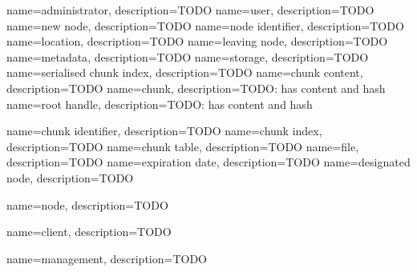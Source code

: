 {
	name={administrator},
	description={TODO}
}
{
	name={user},
	description={TODO}
}
{
	name={new node},
	description={TODO}
}
{
	name={node identifier},
	description={TODO}
}
{
	name={location},
	description={TODO}
}
{
	name={leaving node},
	description={TODO}
}
{
	name={metadata},
	description={TODO}
}
{
	name={storage},
	description={TODO}
}
{
	name={serialised chunk index},
	description={TODO}
}
{
	name={chunk content},
	description={TODO}
}
{
	name={chunk},
	description={TODO: has content and hash}
}
{
	name={root handle},
	description={TODO: has content and hash}
}

{
	name={chunk identifier},
	description={TODO}
}
{
	name={chunk index},
	description={TODO}
}
{
	name={chunk table},
	description={TODO}
}
{
	name={file},
	description={TODO}
}
{
	name={expiration date},
	description={TODO}
}
{
	name={designated node},
	description={TODO}
}

{
	name={node},
	description={TODO}
}

{
	name={client},
	description={TODO}
}

{
	name={management},
	description={TODO}
}


